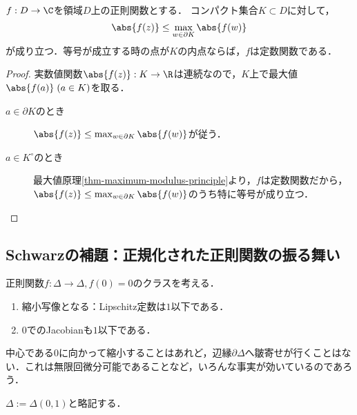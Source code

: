 \documentclass[uplatex, dvipdfmx]{jsreport}
\begin{document}
\begin{corollary}\label{cor-maximum}
    $f:D\to\C$を領域$D$上の正則関数とする．
    コンパクト集合$K\subset D$に対して，
    \[\abs{f(z)}\le\max_{w\in\partial K}\abs{f(w)}\]
    が成り立つ．等号が成立する時の点が$K$の内点ならば，$f$は定数関数である．
\end{corollary}
\begin{proof}
    実数値関数$\abs{f(z)}:K\to\R$は連続なので，$K$上で最大値$\abs{f(a)}\;(a\in K)$を取る．
    \begin{description}
        \item[$a\in\partial K$のとき] $\abs{f(z)}\le\max_{w\in\partial K}\abs{f(w)}$が従う．
        \item[$a\in K^\circ$のとき] 最大値原理\ref{thm-maximum-modulus-principle}より，$f$は定数関数だから，$\abs{f(z)}\le\max_{w\in\partial K}\abs{f(w)}$のうち特に等号が成り立つ．
    \end{description}
\end{proof}

\subsection{Schwarzの補題：正規化された正則関数の振る舞い}

\begin{tcolorbox}[colframe=ForestGreen, colback=ForestGreen!10!white,breakable,colbacktitle=ForestGreen!40!white,coltitle=black,fonttitle=\bfseries\sffamily,
title=]
    正則関数$f:\Delta\to\Delta,f(0)=0$のクラスを考える．
    \begin{enumerate}
        \item 縮小写像となる：Lipschitz定数は$1$以下である．
        \item $0$でのJacobianも$1$以下である．
    \end{enumerate}
    中心である$0$に向かって縮小することはあれど，辺縁$\partial\Delta$へ皺寄せが行くことはない．これは無限回微分可能であることなど，いろんな事実が効いているのであろう．
\end{tcolorbox}

\begin{notation}
    $\Delta:=\Delta(0,1)$と略記する．
\end{notation}
\end{document}

